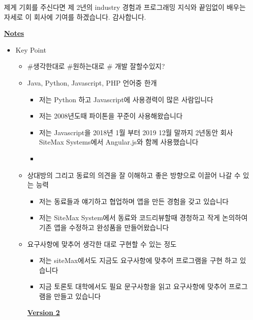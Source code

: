 \documentclass[12pt]{article}
\begin{document}
\bigskip

제게 기회를 주신다면 제 2년의 industry 경험과 프로그래밍 지식와 끝임없이 배우는 자세로 이 회사에 기여를 하겠습니다. 감사합니다.

\underline{\textbf{Notes}}

\begin{itemize}
    \item Key Point
    \begin{itemize}
        \item \#생각한대로 \#원하는대로 \# 개발 잘할수있지?
        \item Java, Python, Javascript, PHP 언어중 한개
        \begin{itemize}
            \item 저는 Python 하고 Javascript에 사용경력이 많은 사람입니다
            \item 저는 2008년도때 파이톤을 꾸준이 사용해왔습니다
            \item 저는 Javascript을 2018년 1월 부터 2019 12월 말까지 2년동안 회사 SiteMax Systems에서 Angular.js와 함께 사용했습니다
            \item
        \end{itemize}
        \item 상대방의 그리고 동료의 의견을 잘 이해하고 좋은 방향으로 이끌어 나갈 수 있는 능력
        \begin{itemize}
            \item 저는 동료들과 얘기하고 협업하며 앱을 만든 경험을 갖고 있습니다
            \item 저는 SiteMax System에서 동료와 코드리뷰할때 경청하고 작게 논의하여 기존 앱을 수정하고 완성품을 만들어왔습니다
        \end{itemize}
        \item 요구사항에 맞추어 생각한 대로 구현할 수 있는 정도
        \begin{itemize}
            \item 저는 siteMax에서도 지금도 요구사항에 맞추어 프로그램을 구현 하고 있습니다
            \item 지금 토론토 대학에서도 필요 문구사항을 읽고 요구사항에 맞추어 프로그램을 만들고 있습니다
        \end{itemize}

        \bigskip

        \underline{\textbf{Version 2}}

        \bigskip


\end{itemize}
\end{itemize}
\end{document}
